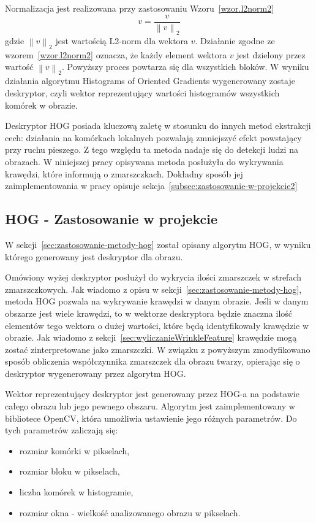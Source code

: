 \documentclass[a4paper,twoside,12pt]{book}
\begin{document}
    Normalizacja jest realizowana przy zastosowaniu Wzoru~\ref{wzor.l2norm2}
    \large
    \begin{equation}
        v = \frac{v}{\left \|v  \right \|_{2}}
        \label{wzor.l2norm2}
    \end{equation}
    \normalsize
    gdzie $\left \|v  \right \|_{2}$ jest wartością L2-norm dla wektora $v$. Działanie zgodne ze
    wzorem~\ref{wzor.l2norm2} oznacza, że każdy element wektora $v$ jest dzielony przez wartość
    $\left \|v  \right\|_{2}$.
    Powyższy proces powtarza się dla wszystkich bloków.
    W wyniku działania algorytmu Histograms of Oriented Gradients wygenerowany zostaje deskryptor, czyli wektor
    reprezentujący wartości histogramów wszystkich komórek w obrazie.

    Deskryptor HOG posiada kluczową zaletę w stosunku do innych metod ekstrakcji cech:
    działania na komórkach lokalnych pozwalają zmniejszyć efekt powstający przy ruchu pieszego.
    Z tego względu ta metoda nadaje się do detekcji ludzi na obrazach.
    W niniejszej pracy opisywana metoda posłużyła do wykrywania krawędzi, które informują o zmarszczkach.
    Dokładny sposób jej
    zaimplementowania w pracy opisuje sekcja~\ref{subsec:zastosowanie-w-projekcie2}

    \subsection*{HOG - Zastosowanie w projekcie}\label{subsec:zastosowanie-w-projekcie2}
    W sekcji~\ref{sec:zastosowanie-metody-hog} został opisany algorytm HOG, w wyniku którego
    generowany jest deskryptor dla obrazu.

    Omówiony wyżej deskryptor posłużył do wykrycia ilości zmarszczek w strefach zmarszczkowych. Jak wiadomo z opisu w
    sekcji~\ref{sec:zastosowanie-metody-hog}, metoda HOG pozwala na wykrywanie krawędzi w danym obrazie. Jeśli w danym
    obszarze jest wiele krawędzi, to w wektorze deskryptora będzie znaczna ilość elementów tego wektora o dużej
    wartości, które będą identyfikowały krawędzie w obrazie. Jak wiadomo z
    sekcji~\ref{sec:wyliczanieWrinkleFeature} krawędzie mogą zostać zinterpretowane jako zmarszczki.
    W związku z powyższym zmodyfikowano sposób obliczenia współczynnika zmarszczek dla obrazu twarzy, opierając się o
    deskryptor wygenerowany przez algorytm HOG.

    Wektor reprezentujący deskryptor jest generowany przez HOG-a na podstawie całego obrazu lub jego pewnego obszaru. Algorytm jest zaimplementowany w bibliotece OpenCV, która umożliwia ustawienie jego różnych parametrów. Do tych parametrów zaliczają się:
    \begin{itemize}
        \item rozmiar komórki w pikselach,
        \item rozmiar bloku w pikselach,
        \item liczba komórek w histogramie,
        \item rozmiar okna - wielkość analizowanego obrazu w pikselach.
    \end{itemize}
\end{document}
